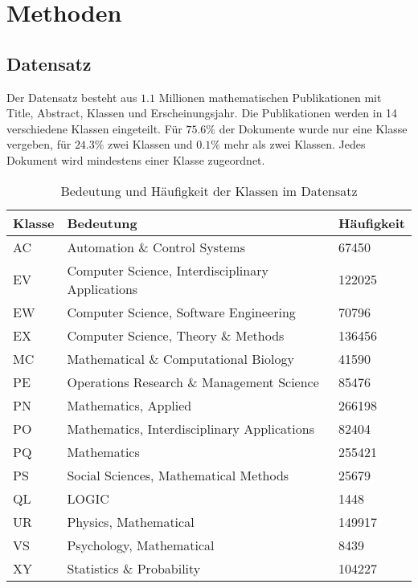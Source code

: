 \section{Methoden}


\subsection{Datensatz}
Der Datensatz besteht aus $1.1$ Millionen mathematischen Publikationen mit Title, Abstract, Klassen und Erscheinungsjahr. Die Publikationen werden in 14 verschiedene Klassen eingeteilt. Für $75.6 \%$ der Dokumente wurde nur eine Klasse vergeben, für $24.3 \%$ zwei Klassen und $0.1 \%$ mehr als zwei Klassen. Jedes Dokument wird mindestens einer Klasse zugeordnet.
\label{sub:datensatz}
\begin{table}[h]
    \centering
    \begin{tabular}{l|l|l}
        \textbf{Klasse} & \textbf{Bedeutung} & \textbf{Häufigkeit}\\
        \hline
        AC & Automation \& Control Systems & 67450\\
        EV & Computer Science, Interdisciplinary Applications & 122025\\
        EW & Computer Science, Software Engineering & 70796\\
        EX & Computer Science, Theory \& Methods & 136456\\
        MC & Mathematical \& Computational Biology & 41590\\
        PE & Operations Research \& Management Science & 85476\\
        PN & Mathematics, Applied & 266198\\
        PO & Mathematics, Interdisciplinary Applications & 82404\\
        PQ & Mathematics & 255421\\
        PS & Social Sciences, Mathematical Methods & 25679\\
        QL & LOGIC & 1448\\
        UR & Physics, Mathematical & 149917\\
        VS & Psychology, Mathematical & 8439\\
        XY & Statistics \& Probability & 104227\\
    \end{tabular}
    \caption{Bedeutung und Häufigkeit der Klassen im Datensatz}
\end{table}



